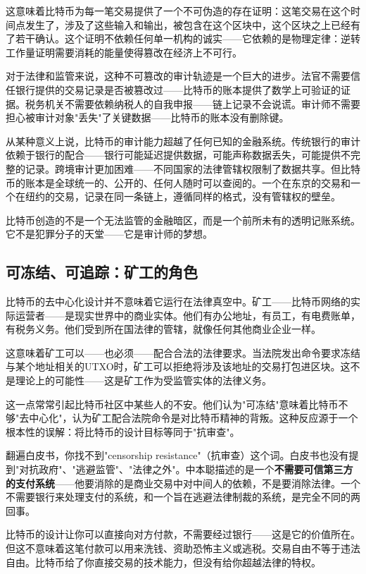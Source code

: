 \documentclass[a4paper,12pt,openany]{ctexbook}
\begin{document}
这意味着比特币为每一笔交易提供了一个不可伪造的存在证明：这笔交易在这个时间点发生了，涉及了这些输入和输出，被包含在这个区块中，这个区块之上已经有了若干确认。这个证明不依赖任何单一机构的诚实——它依赖的是物理定律：逆转工作量证明需要消耗的能量使得篡改在经济上不可行。

对于法律和监管来说，这种不可篡改的审计轨迹是一个巨大的进步。法官不需要信任银行提供的交易记录是否被篡改过——比特币的账本提供了数学上可验证的证据。税务机关不需要依赖纳税人的自我申报——链上记录不会说谎。审计师不需要担心被审计对象"丢失"了关键数据——比特币的账本没有删除键。

从某种意义上说，比特币的审计能力超越了任何已知的金融系统。传统银行的审计依赖于银行的配合——银行可能延迟提供数据，可能声称数据丢失，可能提供不完整的记录。跨境审计更加困难——不同国家的法律管辖权限制了数据共享。但比特币的账本是全球统一的、公开的、任何人随时可以查阅的。一个在东京的交易和一个在纽约的交易，记录在同一条链上，遵循同样的格式，没有管辖权的壁垒。

比特币创造的不是一个无法监管的金融暗区，而是一个前所未有的透明记账系统。它不是犯罪分子的天堂——它是审计师的梦想。


\subsection*{可冻结、可追踪：矿工的角色}


比特币的去中心化设计并不意味着它运行在法律真空中。矿工——比特币网络的实际运营者——是现实世界中的商业实体。他们有办公地址，有员工，有电费账单，有税务义务。他们受到所在国法律的管辖，就像任何其他商业企业一样。

这意味着矿工可以——也必须——配合合法的法律要求。当法院发出命令要求冻结与某个地址相关的UTXO时，矿工可以拒绝将涉及该地址的交易打包进区块。这不是理论上的可能性——这是矿工作为受监管实体的法律义务。

这一点常常引起比特币社区中某些人的不安。他们认为"可冻结"意味着比特币不够"去中心化"，认为矿工配合法院命令是对比特币精神的背叛。这种反应源于一个根本性的误解：将比特币的设计目标等同于"抗审查"。

翻遍白皮书，你找不到"censorship resistance"（抗审查）这个词。白皮书也没有提到"对抗政府"、"逃避监管"、"法律之外"。中本聪描述的是一个\textbf{不需要可信第三方的支付系统}——他要消除的是商业交易中对中间人的依赖，不是要消除法律。一个不需要银行来处理支付的系统，和一个旨在逃避法律制裁的系统，是完全不同的两回事。

比特币的设计让你可以直接向对方付款，不需要经过银行——这是它的价值所在。但这不意味着这笔付款可以用来洗钱、资助恐怖主义或逃税。交易自由不等于违法自由。比特币给了你直接交易的技术能力，但没有给你超越法律的特权。
\end{document}
